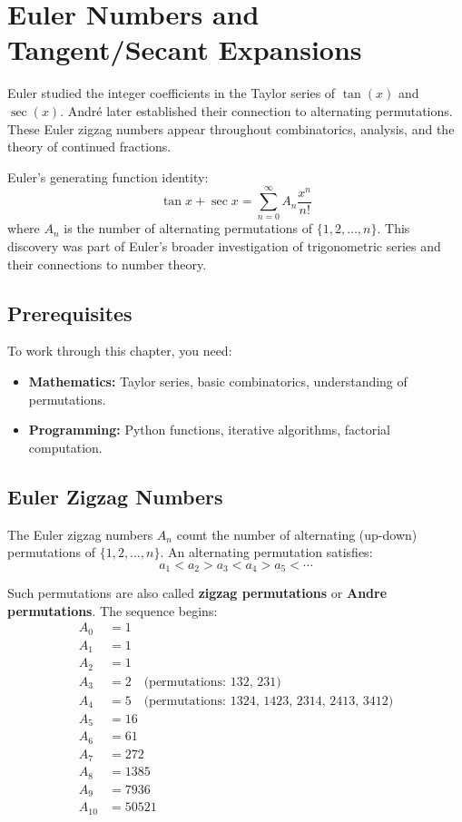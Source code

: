 
\chapter{Euler Numbers and Tangent/Secant Expansions}

\begin{historical}
Euler studied the integer coefficients in the Taylor series of $\tan(x)$ and
$\sec(x)$. André later established their connection to alternating permutations.
These Euler zigzag numbers appear throughout combinatorics, analysis, and the
theory of continued fractions.

Euler's generating function identity:
\[
\tan x + \sec x = \sum_{n=0}^{\infty} A_n \frac{x^n}{n!}
\]
where $A_n$ is the number of alternating permutations of $\{1, 2, \ldots, n\}$.
This discovery was part of Euler's broader investigation of trigonometric series
and their connections to number theory.
\end{historical}

\section{Prerequisites}

To work through this chapter, you need:
\begin{itemize}
    \item \textbf{Mathematics:} Taylor series, basic combinatorics, understanding of permutations.
    \item \textbf{Programming:} Python functions, iterative algorithms, factorial computation.
\end{itemize}

\section{Euler Zigzag Numbers}

The Euler zigzag numbers $A_n$ count the number of alternating (up-down) permutations
of $\{1, 2, \ldots, n\}$. An alternating permutation satisfies:
\[
a_1 < a_2 > a_3 < a_4 > a_5 < \cdots
\]

Such permutations are also called \textbf{zigzag permutations} or \textbf{Andre permutations}.
The sequence begins:
\begin{align*}
A_0 &= 1 \\
A_1 &= 1 \\
A_2 &= 1 \\
A_3 &= 2 \quad \text{(permutations: 132, 231)} \\
A_4 &= 5 \quad \text{(permutations: 1324, 1423, 2314, 2413, 3412)} \\
A_5 &= 16 \\
A_6 &= 61 \\
A_7 &= 272 \\
A_8 &= 1385 \\
A_9 &= 7936 \\
A_{10} &= 50521
\end{align*}

